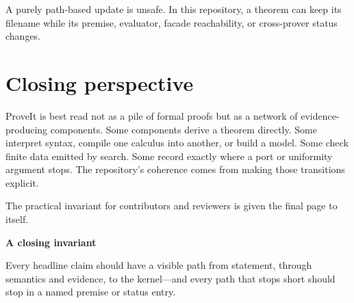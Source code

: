 \documentclass[
  10pt,
  a4paper,
  twoside,
  open=any,
  parskip=half,
  headings=big
]{scrreprt}
\begin{document}
A purely path-based update is unsafe.  In this repository, a theorem can keep
its filename while its premise, evaluator, facade reachability, or
cross-prover status changes.

\section{Closing perspective}

ProveIt is best read not as a pile of formal proofs but as a network of
evidence-producing components.  Some components derive a theorem directly.
Some interpret syntax, compile one calculus into another, or build a model.
Some check finite data emitted by search.  Some record exactly where a port or
uniformity argument stops.  The repository's coherence comes from making
those transitions explicit.

The practical invariant for contributors and reviewers is given the final
page to itself.

\clearpage
\thispagestyle{empty}
\vspace*{\fill}
\begin{center}
\begin{tcolorbox}[
  width=.78\textwidth,
  colback=sky,
  colframe=blue,
  boxrule=.8pt,
  arc=1.8mm,
  left=7mm,right=7mm,top=7mm,bottom=7mm
]
\centering
{\sffamily\bfseries\Large\color{navy}A closing invariant}\par
\vspace{4mm}
{\large
Every headline claim should have a visible path from statement, through
semantics and evidence, to the kernel---and every path that stops short should
stop in a named premise or status entry.\par}
\end{tcolorbox}
\end{center}
\vspace*{\fill}
\end{document}
